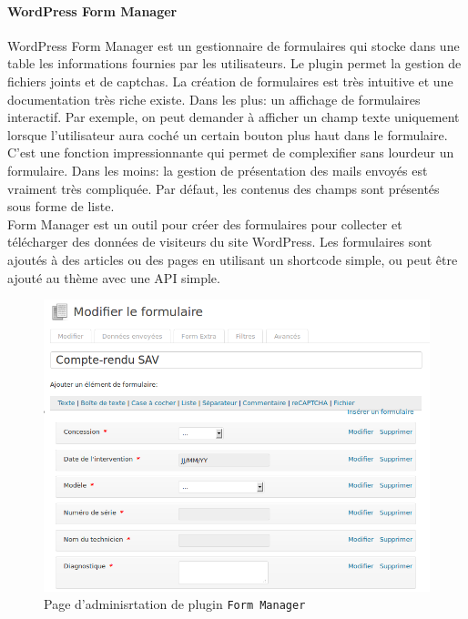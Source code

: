     \paragraph{WordPress Form Manager}

WordPress Form Manager est un gestionnaire de formulaires qui stocke dans une table les informations fournies par les utilisateurs. Le plugin permet la gestion de fichiers joints et de captchas. La création de formulaires est très intuitive et une documentation très riche existe. Dans les plus: un affichage de formulaires interactif. Par exemple, on peut demander à afficher un champ texte uniquement lorsque l’utilisateur aura coché un certain bouton plus haut dans le formulaire. C’est une fonction impressionnante qui permet de complexifier sans lourdeur un formulaire. Dans les moins: la gestion de présentation des mails envoyés est vraiment très compliquée. Par défaut, les contenus des champs sont présentés sous forme de liste.\\
  
Form Manager est un outil pour créer des formulaires pour collecter et télécharger des données de visiteurs du site WordPress. Les formulaires sont ajoutés à des articles ou des pages en utilisant un shortcode simple, ou peut être ajouté au thème avec une API simple.\\

\begin{figure}
\centering
\includegraphics[scale=0.25]{images/formManager}
\caption{Page d'adminisrtation de plugin \texttt{Form Manager}}
\end{figure}

